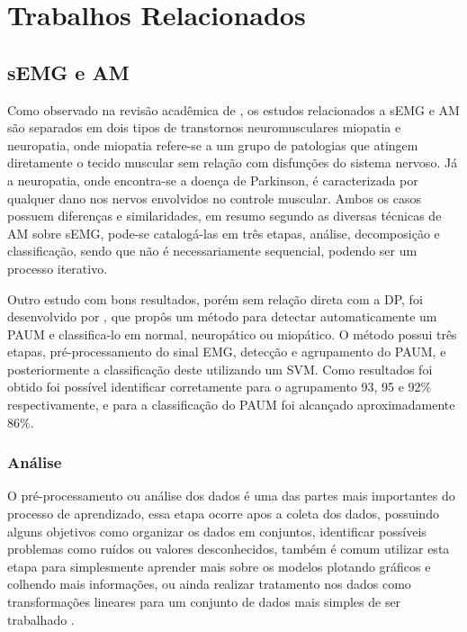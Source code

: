 \chapter{Trabalhos Relacionados}
\label{ch:TrabalhosRelacionados}

\section{sEMG e AM}
Como observado na revisão acadêmica de \cite{yousefi2014characterizing}, os estudos relacionados a sEMG e AM são separados em  dois tipos de transtornos neuromusculares miopatia e neuropatia, onde miopatia refere-se a um grupo de patologias que atingem diretamente o tecido muscular sem relação com disfunções do sistema nervoso. Já a neuropatia, onde encontra-se a doença de Parkinson, é caracterizada por qualquer dano nos nervos envolvidos no controle muscular. Ambos os casos possuem diferenças e similaridades, em resumo segundo \cite{yousefi2014characterizing} as diversas técnicas de AM sobre sEMG, pode-se catalogá-las em três etapas, análise, decomposição e classificação, sendo que não é necessariamente sequencial, podendo ser um processo iterativo.

Outro estudo com bons resultados, porém sem relação direta com a DP, foi desenvolvido por \cite{katsis2006novel}, que propôs um método para detectar automaticamente um PAUM e classifica-lo em normal, neuropático ou miopático. O método possui três etapas, pré-processamento do sinal EMG, detecção e agrupamento do PAUM, e posteriormente a classificação deste utilizando um SVM. Como resultados foi obtido foi possível identificar corretamente para o agrupamento 93, 95 e 92\% respectivamente, e para a classificação do PAUM foi alcançado aproximadamente 86\%. 

\subsection{Análise}
O pré-processamento ou análise dos dados é uma das partes mais importantes do processo de aprendizado, essa etapa ocorre apos a coleta dos dados, possuindo alguns objetivos como organizar os dados em conjuntos, identificar possíveis problemas como ruídos ou valores desconhecidos, também é comum utilizar esta etapa para simplesmente aprender mais sobre os modelos plotando gráficos e colhendo mais informações, ou ainda realizar tratamento nos dados como transformações lineares para um conjunto de dados mais simples de ser trabalhado \cite{batista2003pre}. 

